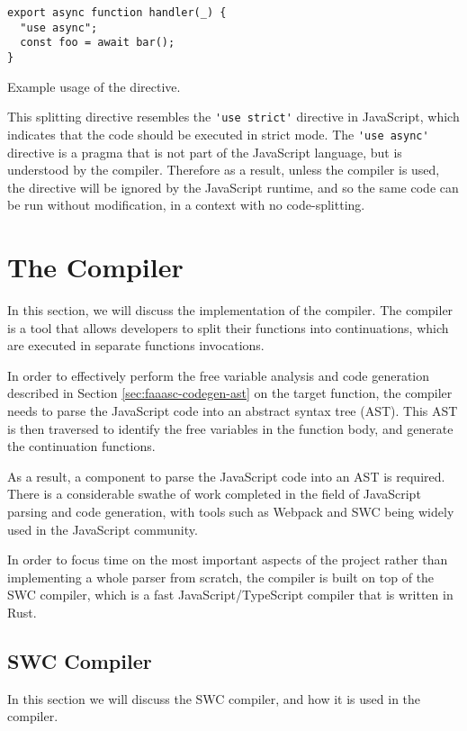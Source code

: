 \begin{listing}[H]
\begin{verbatim}
export async function handler(_) {
  "use async";
  const foo = await bar();
}
\end{verbatim}
\caption{Example usage of the directive.}
\label{listing:use-async-simple-example}
\end{listing}

This splitting directive resembles the \verb|'use strict'| directive in JavaScript, which indicates that the code should be executed in strict mode. The \verb|'use async'| directive is a pragma that is not part of the JavaScript language, but is understood by the \faaasc{} compiler. Therefore as a result, unless the \faaasc{} compiler is used, the directive will be ignored by the JavaScript runtime, and so the same code can be run without modification, in a context with no code-splitting.

\section{The \faaasc{} Compiler}
In this section, we will discuss the implementation of the \faaasc{} compiler. The \faaasc{} compiler is a tool that allows developers to split their functions into continuations, which are executed in separate \awslambda{} functions invocations.

In order to effectively perform the free variable analysis and code generation described in Section \ref{sec:faaasc-codegen-ast} on the target \faas{} function, the \faaasc{} compiler needs to parse the JavaScript code into an abstract syntax tree (AST). This AST is then traversed to identify the free variables in the function body, and generate the continuation functions.

As a result, a component to parse the JavaScript code into an AST is required. There is a considerable swathe of work completed in the field of JavaScript parsing and code generation, with tools such as Webpack\cite{Webpack} and SWC\cite{RustbasedPlatformWeb} being widely used in the JavaScript community.

In order to focus time on the most important aspects of the project rather than implementing a whole parser from scratch, the \faaasc{} compiler is built on top of the SWC compiler, which is a fast JavaScript/TypeScript compiler that is written in Rust.

\subsection{SWC Compiler}
In this section we will discuss the SWC compiler, and how it is used in the \faaasc{} compiler.

